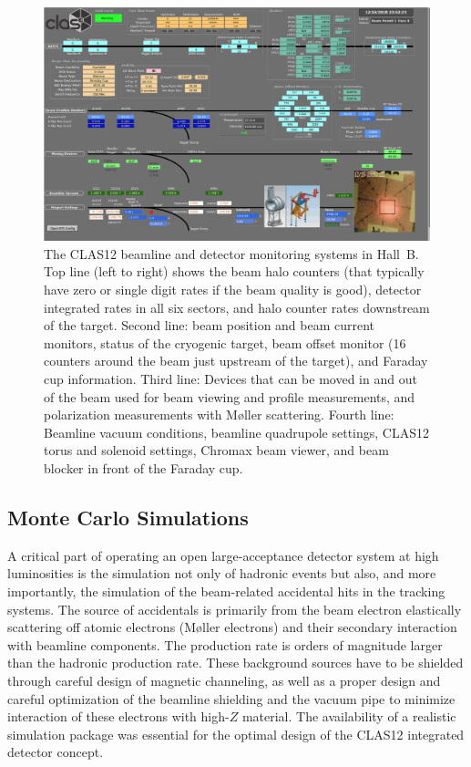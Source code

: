 \documentclass[final,3p]{elsarticle}
\begin{document}
\begin{twocolumn}
\begin{figure}
\centerline{\includegraphics[width=1.0\columnwidth]{Beam-screen.png}}
\caption{The CLAS12 beamline and detector monitoring systems in Hall~B. Top line (left to right) shows the beam halo
  counters (that typically have zero or single digit rates if the beam quality is good), detector integrated rates in all six
  sectors, and halo counter rates downstream of the target. Second line: beam position and beam current monitors, status
  of the cryogenic target, beam offset monitor (16 counters around the beam just upstream of the target), and Faraday
  cup information. Third line: Devices that can be moved in and out of the beam used for beam viewing and profile
  measurements, and polarization measurements with M{\o}ller scattering. Fourth line: Beamline vacuum conditions,
  beamline quadrupole settings, CLAS12 torus and solenoid settings, Chromax beam viewer, and beam blocker in front of
  the Faraday cup.} 
\label{beam-monitoring}
\end{figure}

\subsection{Monte Carlo Simulations} 

A critical part of operating an open large-acceptance detector system at high luminosities is the simulation not
only of hadronic events but also, and more importantly, the simulation of the beam-related accidental hits in the
tracking systems. The source of accidentals is primarily from the beam electron elastically scattering off atomic
electrons (M{\o}ller electrons) and their secondary interaction with beamline components. The production rate
is orders of magnitude larger than the hadronic production rate. These background sources have to be shielded
through careful design of magnetic channeling, as well as a proper design and careful optimization  of the beamline 
shielding and the vacuum pipe to minimize interaction of these electrons with high-$Z$ material. The availability of
a realistic simulation package was essential for the optimal design of the CLAS12 integrated detector concept.


\end{twocolumn}
\end{document}

